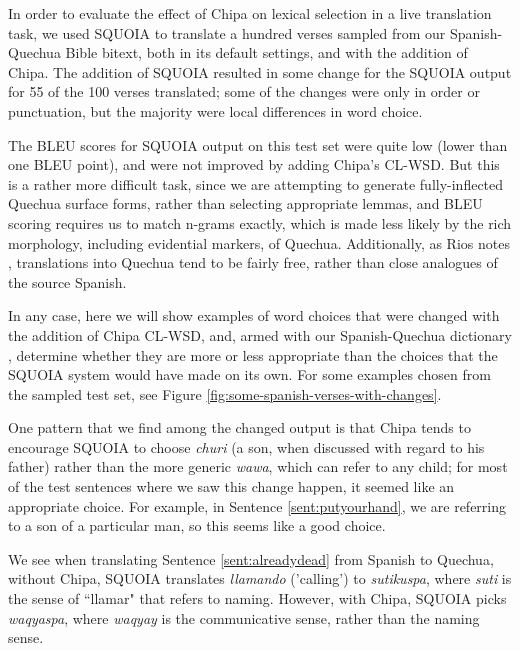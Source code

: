 In order to evaluate the effect of Chipa on lexical selection in a live
translation task, we used SQUOIA to translate a hundred verses sampled from our
Spanish-Quechua Bible bitext, both in its default settings, and with the
addition of Chipa. The addition of SQUOIA resulted in some change for the
SQUOIA output for 55 of the 100 verses translated; some of the changes were
only in order or punctuation, but the majority were local differences in word
choice.

The BLEU scores for SQUOIA output on this test set were quite low (lower than
one BLEU point), and were not improved by adding Chipa's CL-WSD. But this is a
rather more difficult task, since we are attempting to generate fully-inflected
Quechua surface forms, rather than selecting appropriate lemmas, and BLEU
scoring requires us to match n-grams exactly, which is made less likely by the
rich morphology, including evidential markers, of Quechua. Additionally, as
Rios notes \cite[\S 5.9]{rios2015basic}, translations into Quechua tend to be
fairly free, rather than close analogues of the source Spanish.

In any case, here we will show examples of word choices that were changed with
the addition of Chipa CL-WSD, and, armed with our Spanish-Quechua dictionary
\cite{academiamayor}, determine whether they are more or less appropriate than
the choices that the SQUOIA system would have made on its own. For some
examples chosen from the sampled test set, see Figure
\ref{fig:some-spanish-verses-with-changes}.


One pattern that we find among the changed output is that Chipa tends to
encourage SQUOIA to choose \emph{churi} (a son, when discussed with regard to
his father) rather than the more generic \emph{wawa}, which can refer to any
child; for most of the test sentences where we saw this change happen, it
seemed like an appropriate choice. For example, in Sentence
\ref{sent:putyourhand}, we are referring to a son of a particular man, so this
seems like a good choice.

We see when translating Sentence \ref{sent:alreadydead}  from Spanish to
Quechua, without Chipa, SQUOIA translates \emph{llamando} ('calling') to
\emph{sutikuspa}, where \emph{suti} is the sense of ``llamar" that refers to
naming. However, with Chipa, SQUOIA picks \emph{waqyaspa}, where \emph{waqyay}
is the communicative sense, rather than the naming sense.

